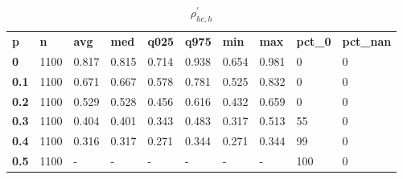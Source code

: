 \begin{table}[h]
 \centering 
\footnotesize
\caption{$\rho_{hc,h}^\prime $}
\label{tab:alphahch}
\begin{tabular}[h]{| l l l l l l l l l l|
    } \hline
\textbf{ p} & \textbf{ n} & \textbf{ avg} & \textbf{ med} & \textbf{ q025} & \textbf{ q975} & \textbf{ min} & \textbf{ max} & \textbf{ pct\_0} & \textbf{ pct\_nan}
           \\
  \textbf{  0} & 1100 & 0.817 & 0.815 & 0.714 & 0.938 & 0.654 & 0.981 &   0 & 0
           \\
  \textbf{0.1} & 1100 & 0.671 & 0.667 & 0.578 & 0.781 & 0.525 & 0.832 &   0 & 0
           \\
  \textbf{0.2} & 1100 & 0.529 & 0.528 & 0.456 & 0.616 & 0.432 & 0.659 &   0 & 0
           \\
  \textbf{0.3} & 1100 & 0.404 & 0.401 & 0.343 & 0.483 & 0.317 & 0.513 &  55 & 0
           \\
  \textbf{0.4} & 1100 & 0.316 & 0.317 & 0.271 & 0.344 & 0.271 & 0.344 &  99 & 0
           \\
  \textbf{0.5} & 1100 & - & - & - & - & - & - & 100 & 0
           \\
 \hline \end{tabular}
 \end{table}
